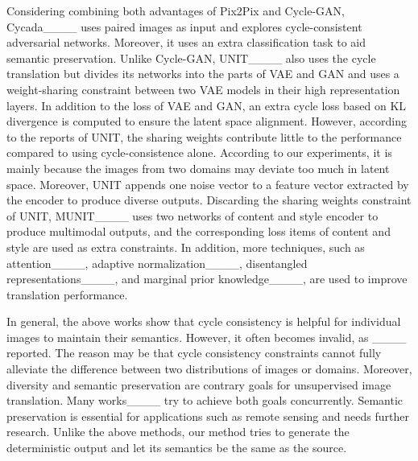 Considering combining both advantages of Pix2Pix and Cycle-GAN, Cycada____ uses paired images as input and explores cycle-consistent adversarial networks. Moreover, it uses an extra classification task to aid semantic preservation. Unlike Cycle-GAN, UNIT____ also uses the cycle translation but divides its networks into the parts of VAE and GAN and uses a weight-sharing constraint between two VAE models in their high representation layers. In addition to the loss of VAE and GAN, an extra cycle loss based on KL divergence is computed to ensure the latent space alignment. However, according to the reports of UNIT, the sharing weights contribute little to the performance compared to using cycle-consistence alone. According to our experiments, it is mainly because the images from two domains may deviate too much in latent space. Moreover, UNIT appends one noise vector to a feature vector extracted by the encoder to produce diverse outputs. Discarding the sharing weights constraint of UNIT, MUNIT____ uses two networks of content and style encoder to produce multimodal outputs, and the corresponding loss items of content and style are used as extra constraints. In addition, more techniques, such as attention____, adaptive normalization____, disentangled representations____, and marginal prior knowledge____, are used to improve translation performance.

In general, the above works show that cycle consistency is helpful for individual images to maintain their semantics. However, it often becomes invalid, as ____ reported. The reason may be that cycle consistency constraints cannot fully alleviate the difference between two distributions of images or domains. Moreover, diversity and semantic preservation are contrary goals for unsupervised image translation. Many works____ try to achieve both goals concurrently. Semantic preservation is essential for applications such as remote sensing and needs further research. Unlike the above methods, our method tries to generate the deterministic output and let its semantics be the same as the source.

